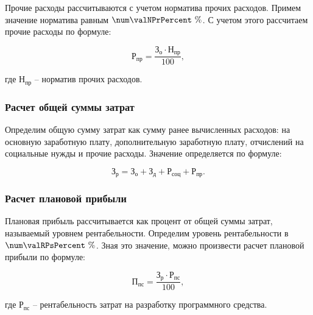 
Прочие расходы рассчитываются с учетом норматива прочих расходов. Примем значение
норматива равным $ \num\valNPrPercent \ \% $. С учетом этого рассчитаем прочие расходы
по формуле:

\begin{equation}
  \label{eq:econ:RPr}
  \text{Р}_\text{пр} = \frac{\text{З}_\text{о} \cdot \text{Н}_\text{пр}}
    {100},
\end{equation}
\begin{explanationx}
  \item[где] $ \text{Н}_\text{пр} $ -- норматив прочих расходов.
\end{explanationx}


\subsubsection{Расчет общей суммы затрат}

Определим общую сумму затрат как сумму ранее вычисленных расходов: на основную
заработную плату, дополнительную заработную плату, отчислений на социальные нужды и
прочие расходы. Значение определяется по формуле:

\begin{equation}
  \label{eq:econ:Zr}
  \text{З}_\text{р} = \text{З}_\text{о} + \text{З}_\text{д}
    + \text{Р}_\text{соц} + \text{Р}_\text{пр}.
\end{equation}


\subsubsection{Расчет плановой прибыли}


Плановая прибыль рассчитывается как процент от общей суммы затрат, называемый
уровнем рентабельности. Определим уровень рентабельности
в $ \num\valRPsPercent \ \% $. Зная это значение, можно произвести расчет плановой
прибыли по формуле:

\begin{equation}
  \label{eq:econ:PPs}
  \text{П}_\text{пс} = \frac{\text{З}_\text{р} \cdot \text{Р}_\text{пс}}
    {100},
\end{equation}
\begin{explanationx}
  \item[где] $ \text{Р}_\text{пс} $ -- рентабельность затрат на разработку программного средства.
\end{explanationx}

